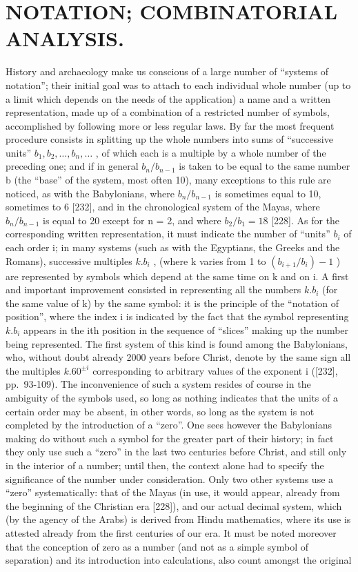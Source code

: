 \chapter{NOTATION; COMBINATORIAL ANALYSIS.}

History and archaeology make us conscious of a large number of ``systems of notation''; their initial goal was to attach to each individual whole number (up to a limit which depends on the needs of the application) a name and a written representation, made up of a combination of a restricted number of symbols, accomplished by following more or less regular laws. By far the most frequent procedure consists in splitting up the whole numbers into sums of ``successive units'' \(b_{1}, b_{2}, \ldots, b_{n}, \ldots\) , of which each is a multiple by a whole number of the preceding one; and if in general \(b_{n}/b_{n-1}\) is taken to be equal to the same number b (the ``base'' of the system, most often 10), many exceptions to this rule are noticed, as with the Babylonians, where \(b_{n}/b_{n-1}\) is sometimes equal to 10, sometimes to 6 {[}232{]}, and in the chronological system of the Mayas, where \(b_{n}/b_{n-1}\) is equal to 20 except for n = 2, and where \(b_{2}/b_{1} = 18\) {[}228{]}. As for the corresponding written representation, it must indicate the number of ``units'' \(b_{i}\) of each order i; in many systems (such as with the Egyptians, the Greeks and the Romans), successive multiples \(k.b_{i}\) , (where k varies from 1 to \((b_{i+1}/b_{i}) - 1\) ) are represented by symbols which depend at the same time on k and on i. A first and important improvement consisted in representing all the numbers \(k.b_{i}\) (for the same value of k) by the same symbol: it is the principle of the ``notation of position'', where the index i is indicated by the fact that the symbol representing \(k.b_{i}\) appears in the ith position in the sequence of ``slices'' making up the number being represented. The first system of this kind is found among the Babylonians, who, without doubt already 2000 years before Christ, denote by the same sign all the multiples \(k.60^{\pm i}\) corresponding to arbitrary values of the exponent i ({[}232{]}, pp.~93-109). The inconvenience of such a system resides of course in the ambiguity of the symbols used, so long as nothing indicates that the units of a certain order may be absent, in other words, so long as the system is not completed by the introduction of a ``zero''. One sees however the Babylonians making do without such a symbol for the greater part of their history; in fact they only use such a ``zero'' in the last two centuries before Christ, and still only in the interior of a number; until then, the context alone had to specify the significance of the number under consideration. Only two other systems use a ``zero'' systematically: that of the Mayas (in use, it would appear, already from the beginning of the Christian era {[}228{]}), and our actual decimal system, which (by the agency of the Arabs) is derived from Hindu mathematics, where its use is attested already from the first centuries of our era. It must be noted moreover that the conception of zero as a number (and not as a simple symbol of separation) and its introduction into calculations, also count amongst the original 